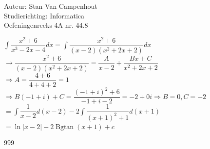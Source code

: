 \documentclass[a4paper]{article}
\begin{document}
  
\noindent \large Auteur: Stan Van Campenhout \\
\noindent \large Studierichting:  Informatica\\
\noindent \large Oefeningenreeks 4A nr. 44.8\\

\medskip

\normalsize

$ \displaystyle\int\dfrac{x^2+6}{x^3-2x-4}dx = \displaystyle\int\dfrac{x^2+6}{\left(x-2\right)\left(x^2+2x+2\right)}dx $\\

$ \rightarrow \dfrac{x^2+6}{\left(x-2\right)\left(x^2+2x+2\right)} = \dfrac{A}{x-2} + \dfrac{Bx + C}{x^2+2x+2} $\\

$ \Rightarrow A = \dfrac{4+6}{4+4+2} = 1 $\\

$ \Rightarrow B\left(-1+i\right) + C = \dfrac{\left(-1+i\right)^2+6}{-1+i-2} = -2 + 0i \Rightarrow B = 0, C = -2 $\\

$ = \displaystyle\int\dfrac{1}{x-2}d\left(x-2\right)-2\displaystyle\int\dfrac{1}{\left(x+1\right)^2+1}d\left(x+1\right) $\\

$ = \ln|x-2|-2\operatorname{Bgtan}\left(x+1\right) + c $\\

\begin{thebibliography}{999}
\end{thebibliography}
\end{document}

